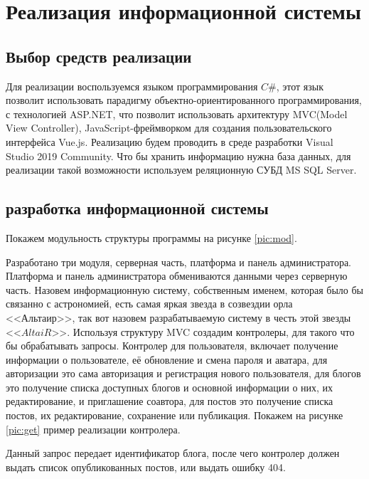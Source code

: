 \section{Реализация информационной системы}
\subsection{Выбор средств реализации}

Для реализации воспользуемся языком программирования $C\#$, этот язык позволит использовать парадигму объектно-ориентированного программирования, с технологией ASP.NET, что позволит использовать архитектуру MVC(Model View Controller), JavaScript-фреймворком для создания пользовательского интерфейса Vue.js. Реализацию будем проводить в среде разработки Visual Studio 2019 Community. Что бы хранить информацию нужна база данных, для реализации такой возможности используем реляционную СУБД MS SQL Server.

\subsection{разработка информационной системы}

Покажем модульность структуры программы на рисунке \ref{pic:mod}.



Разработано три модуля, серверная часть, платформа и панель администратора. Платформа и панель администратора обмениваются данными через серверную часть. Назовем информационную систему, собственным именем, которая было бы связанно с астрономией, есть самая яркая звезда в созвездии орла <<Альтаир>>, так вот назовем разрабатываемую систему в честь этой звезды <<$AltaiR$>>. Используя структуру MVC создадим контролеры, для такого что бы обрабатывать запросы. Контролер для пользователя, включает получение информации о пользователе, её обновление и смена пароля и аватара, для авторизации это сама авторизация и регистрация нового пользователя, для блогов это получение списка доступных блогов и основной информации о них, их редактирование, и приглашение соавтора, для постов это получение списка постов, их редактирование, сохранение или публикация. Покажем на рисунке \ref{pic:get} пример реализации контролера.


Данный запрос передает идентификатор блога, после чего контролер должен выдать список опубликованных постов, или выдать ошибку 404.

